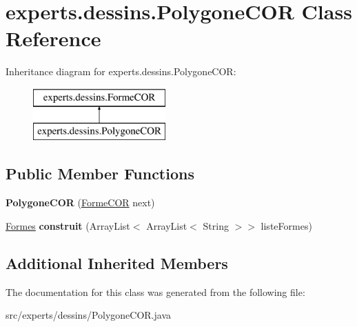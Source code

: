 \hypertarget{classexperts_1_1dessins_1_1_polygone_c_o_r}{}\section{experts.\+dessins.\+Polygone\+C\+OR Class Reference}
\label{classexperts_1_1dessins_1_1_polygone_c_o_r}
Inheritance diagram for experts.\+dessins.\+Polygone\+C\+OR\+:\begin{figure}[H]
\begin{center}
\leavevmode
\includegraphics[height=2.000000cm]{classexperts_1_1dessins_1_1_polygone_c_o_r}
\end{center}
\end{figure}
\subsection*{Public Member Functions}
\begin{DoxyCompactItemize}
\item 
\mbox{\label{classexperts_1_1dessins_1_1_polygone_c_o_r_ac297f129d9172592e814917597592167}} 
{\bfseries Polygone\+C\+OR} (\mbox{\hyperlink{classexperts_1_1dessins_1_1_forme_c_o_r}{Forme\+C\+OR}} next)
\item 
\mbox{\label{classexperts_1_1dessins_1_1_polygone_c_o_r_a53acfc15656155dd4cdde1a68b6312bf}} 
\mbox{\hyperlink{classdessin_1_1_formes}{Formes}} {\bfseries construit} (Array\+List$<$ Array\+List$<$ String $>$$>$ liste\+Formes)
\end{DoxyCompactItemize}
\subsection*{Additional Inherited Members}


The documentation for this class was generated from the following file\+:\begin{DoxyCompactItemize}
\item 
src/experts/dessins/Polygone\+C\+O\+R.\+java\end{DoxyCompactItemize}
